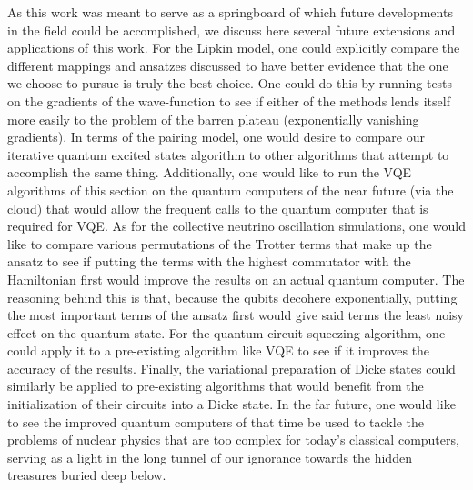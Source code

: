 \documentclass[Dual]{msu-thesis}
\begin{document}
As this work was meant to serve as a springboard of which future developments in the field could be accomplished, we discuss here several future extensions and applications of this work. For the Lipkin model, one could explicitly compare the different mappings and ansatzes discussed to have better evidence that the one we choose to pursue is truly the best choice. One could do this by running tests on the gradients of the wave-function to see if either of the methods lends itself more easily to the problem of the barren plateau (exponentially vanishing gradients). In terms of the pairing model, one would desire to compare our iterative quantum excited states algorithm to other algorithms that attempt to accomplish the same thing. Additionally, one would like to run the VQE algorithms of this section on the quantum computers of the near future (via the cloud) that would allow the frequent calls to the quantum computer that is required for VQE. As for the collective neutrino oscillation simulations, one would like to compare various permutations of the Trotter terms that make up the ansatz to see if putting the terms with the highest commutator with the Hamiltonian first would improve the results on an actual quantum computer. The reasoning behind this is that, because the qubits decohere exponentially, putting the most important terms of the ansatz first would give said terms the least noisy effect on the quantum state. For the quantum circuit squeezing algorithm, one could apply it to a pre-existing algorithm like VQE to see if it improves the accuracy of the results. Finally, the variational preparation of Dicke states could similarly be applied to pre-existing algorithms that would benefit from the initialization of their circuits into a Dicke state. In the far future, one would like to see the improved quantum computers of that time be used to tackle the problems of nuclear physics that are too complex for today's classical computers, serving as a light in the long tunnel of our ignorance towards the hidden treasures buried deep below.
\end{document}
